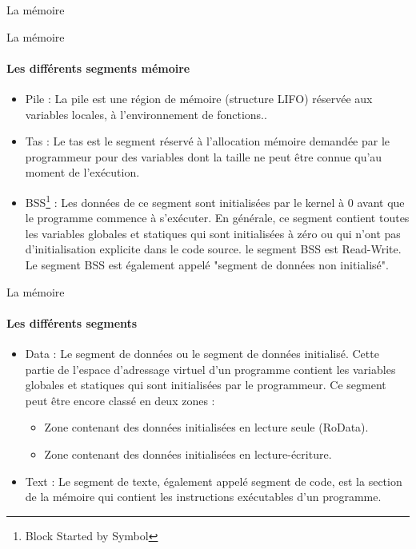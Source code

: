 \documentclass{beamer}
\begin{document}
\begin{darkframes}
\begin{frame}{La mémoire}
\begin{figure}[!h]
  		\end{figure}
  	\end{frame}
  	
  	\begin{frame}{La mémoire}
  		\framesubtitle{Les différents segments mémoire}
  		\begin{itemize}
  			\item \alert{Pile} : La pile est une région de mémoire (structure LIFO) réservée aux variables locales, à l'environnement de fonctions..
  			\item \alert{Tas} : Le tas est le segment réservé à l'allocation mémoire demandée par le programmeur pour des variables dont la taille ne peut être connue qu'au moment de l'exécution.
  			\item \alert{BSS}\footnote[frame]{Block Started by Symbol} : Les données de ce segment sont initialisées par le kernel à 0 avant que le programme commence à s'exécuter. En générale, ce segment contient toutes les variables \alert{globales} et \alert{statiques} qui sont initialisées à zéro ou qui n'ont pas d'initialisation explicite dans le code source. le segment BSS est \alert{Read-Write}. Le segment BSS est également appelé "\alert{segment de données non initialisé}".
  		\end{itemize}
  	\end{frame}
  
  	\begin{frame}{La mémoire}
  		\framesubtitle{Les différents segments}
  		\begin{itemize}
  			\item \alert{Data} : Le segment de données ou le segment de données initialisé. Cette partie de l'espace d'adressage virtuel d'un programme contient les variables globales et statiques qui sont initialisées par le programmeur. Ce segment peut être encore classé en deux zones :
  			\begin{itemize}
  				\item Zone contenant des données initialisées en lecture seule (RoData).
  				\item Zone contenant des données initialisées en lecture-écriture.
  			\end{itemize}
  			\item \alert{Text} : Le segment de texte, également appelé segment de code, est la section de la mémoire qui contient les instructions exécutables d'un programme.
  		\end{itemize}
  	\end{frame}


\end{darkframes}
\end{document}
